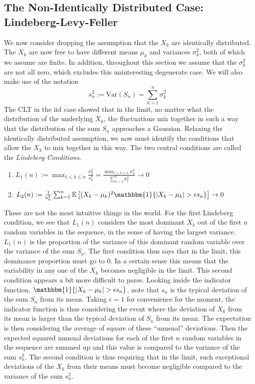 \documentclass[12pt]{article}
\newcommand*{\abs}[1]{\left\lvert#1\right\rvert}
\newcommand{\E}{\mathbb{E}}
\newcommand{\Var}{\mathrm{Var}}
\begin{document}
\subsection{The Non-Identically Distributed Case: Lindeberg-Levy-Feller}
We now consider dropping the assumption that the $X_k$ are identically distributed. The $X_k$ are now free to have different means $\mu_k$ and variances $\sigma_k^2$, both of which 
we assume are finite. In addition, throughout this section we assume that the $\sigma_k^2$ are not all zero, which excludes this uninteresting degenerate case. We will also make use of the 
notation 
\[s_n^2 := \Var(S_n) = \sum_{k = 1}^{n} \sigma_k^2\]
The CLT in the iid case showed that in the limit, no matter what the distribution of the underlying $X_k$, the fluctuations mix together in such a way that the distribution of the sum $S_n$ 
approaches a Gaussian. Relaxing the identically distributed assumption, we now must identify the conditions that allow the $X_k$ to mix together in this way. The two central conditions are 
called the \textit{Lindeberg Conditions}. 
\begin{enumerate}
\item $L_1(n) := \max_{1 \leq k \leq n} \frac{\sigma_k^2}{s_n^2} = \frac{\max_{1 \leq k \leq n} \sigma_k^2}{\sum_{k = 1}^{n} \sigma_k^2} \to 0$
\item $L_2(n) := \frac{1}{s_n^2} \sum_{k = 1}^{n} \E\left[(X_k - \mu_k)^2 \mathbbm{1}\{\abs{X_k - \mu_k} > \epsilon s_n\} \right] \to 0$
\end{enumerate} 
These are not the most intuitive things in the world. For the first Lindeberg condition, we see that $L_1(n)$ considers the most dominant $X_k$ out of the first $n$ random variables in the
sequence, in the sense of having the largest variance. $L_1(n)$ is the proportion of the variance of this dominant random variable over the variance of the sum $S_n$. The first condition thus 
says that in the limit, this dominance proportion must go to $0$. In a certain sense this means that the variability in any one of the $X_k$ becomes negligible in the limit. This second condition 
appears a bit more difficult to parse. Looking inside the indicator function, $\mathbbm{1}\{\abs{X_k - \mu_k} > \epsilon s_n\}$, note that $s_n$ is the typical deviation of the sum $S_n$ 
from its mean. Taking $\epsilon = 1$ for convenience for the moment, the indicator function is thus considering the event where the deviation of $X_k$ from its mean is larger than the typical 
deviation of $S_n$ from its mean. The expectation is then considering the average of square of these ``unusual'' deviations. Then the expected squared unusual deviations for each of the 
first $n$ random variables in the sequence are summed up and this value is compared to the variance of the sum $s_n^2$. The second condition is thus requiring that in the limit, such exceptional 
deviations of the $X_k$ from their means must become negligible compared to the variance of the sum $s_n^2$. 
\end{document}
